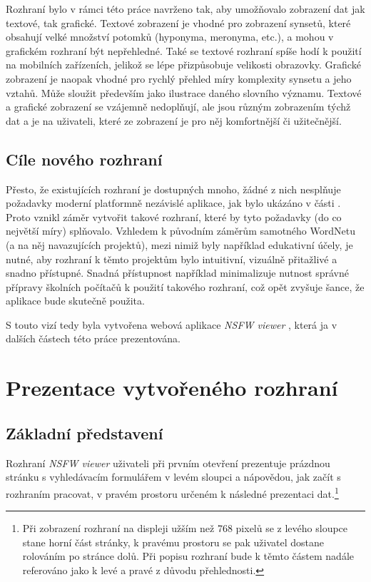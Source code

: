 \documentclass[a4paper, 11pt, oneside]{book}
\newcommand{\simplywn}{\textit{NSFW viewer} }
\newcommand{\itNameRef}[1]{\textit{\nameref{#1}}}
\begin{document}
				Rozhraní bylo v rámci této práce navrženo tak, aby umožňovalo zobrazení dat jak textové, tak grafické. Textové zobrazení je vhodné pro zobrazení synsetů, které obsahují velké množství potomků (hyponyma, meronyma, etc.), a mohou v grafickém rozhraní být nepřehledné. Také se textové rozhraní spíše hodí k použití na mobilních zařízeních, jelikož se lépe přizpůsobuje velikosti obrazovky. Grafické zobrazení je naopak vhodné pro rychlý přehled míry komplexity synsetu a jeho vztahů. Může sloužit především jako ilustrace daného slovního významu. Textové a grafické zobrazení se vzájemně nedoplňují, ale jsou různým zobrazením týchž dat a je na uživateli, které ze zobrazení je pro něj komfortnější či užitečnější.

			\section{Cíle nového rozhraní}

				Přesto, že existujících rozhraní je dostupných mnoho, žádné z nich nesplňuje požadavky moderní platformně nezávislé aplikace, jak bylo ukázáno v části \itNameRef{part:zwei}. Proto vznikl záměr vytvořit takové rozhraní, které by tyto požadavky (do co největší míry) splňovalo. Vzhledem k původním záměrům samotného WordNetu (a na něj navazujících projektů), mezi nimiž byly například edukativní účely, je nutné, aby rozhraní k těmto projektům bylo intuitivní, vizuálně přitažlivé a snadno přístupné. Snadná přístupnost například minimalizuje nutnost správné přípravy školních počítačů k použití takového rozhraní, což opět zvyšuje šance, že aplikace bude skutečně použita.

				S touto vizí tedy byla vytvořena webová aplikace \simplywn, která ja v dalších částech této práce prezentována.

		\chapter{Prezentace vytvořeného rozhraní}
		\label{cha:ui}

			\section{Základní představení}

				Rozhraní \simplywn uživateli při prvním otevření prezentuje prázdnou stránku s vyhledávacím formulářem v levém sloupci a nápovědou, jak začít s rozhraním pracovat, v pravém prostoru určeném k následné prezentaci dat.\footnote{Při zobrazení rozhraní na displeji užším než 768 pixelů se z levého sloupce stane horní část stránky, k pravému prostoru se pak uživatel dostane rolováním po stránce dolů. Při popisu rozhraní bude k těmto částem nadále referováno jako k levé a pravé z důvodu přehlednosti.}
\end{document}
